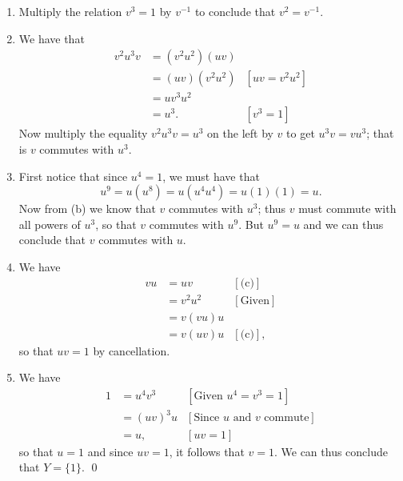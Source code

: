 \begin{enumerate}
      \begin{enumerate}
         \item Multiply the relation $v^3 = 1$ by $v^{-1}$ to conclude that
               $v^2 = v^{-1}$.
         \item We have that
               \begin{align*}
                  v^2u^3v &= (v^2u^2)(uv) \\
                          &= (uv)(v^2u^2) &[uv = v^2u^2] \\
                          &= uv^3u^2 \\
                          &= u^3. &[v^3 = 1]
               \end{align*}
               Now multiply the equality $v^2u^3v = u^3$ on the left by $v$ to
               get $u^3v = vu^3$; that is $v$ commutes with $u^3$.
         \item First notice that since $u^4 = 1$, we must have that
               $$u^9 = u(u^8) = u(u^4u^4) = u(1)(1) = u.$$
               Now from (b) we know that $v$ commutes with $u^3$; thus $v$ must
               commute with all powers of $u^3$, so that $v$ commutes with
               $u^9$. But $u^9 = u$ and we can thus conclude that $v$ commutes
               with $u$.
         \item We have
               \begin{align*}
                  vu &= uv &[\text{(c)}] \\
                     &= v^2u^2 &[\text{Given}] \\
                     &= v(vu)u \\
                     &= v(uv)u &[\text{(c)}],
               \end{align*}
               so that $uv = 1$ by cancellation.
         \item We have
               \begin{align*}
                  1 &= u^4v^3 &[\text{Given }u^4 = v^3 = 1] \\
                    &= (uv)^3u &[\text{Since }u\text{ and }v\text{ commute}] \\
                    &= u, &[uv = 1]
               \end{align*}
               so that $u = 1$ and since $uv = 1$, it follows that $v = 1$. We
               can thus conclude that $Y = \{1\}$. \qed
      \end{enumerate}
\end{enumerate}
